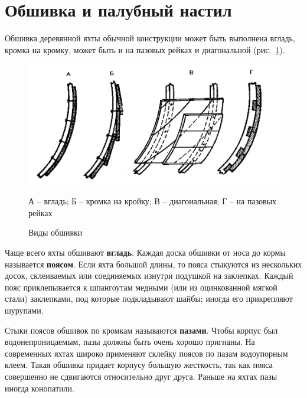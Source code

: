 \documentclass[a4paper, 12pt, twoside, final]{scrbook}
\begin{document}
%
%

\section{Обшивка и палубный настил}

Обшивка деревянной яхты обычной конструкции может быть выполнена вгладь,
кромка на кромку, может быть и на пазовых рейках и диагональной (рис.~\ref{fig:29}).

\begin{figure}[htbp]
\begin{centering}
\includegraphics{pics/Vidy_obshivki}
\par\end{centering}

\protect\caption{\label{fig:29}Виды обшивки}


\begin{centering}\small
А \--- вгладь; Б \--- кромка на кройку; В \--- диагональная; Г \--- на пазовых рейках
\par\end{centering}

\end{figure}


Чаще всего яхты обшивают \textbf{вгладь}. Каждая доска обшивки от
носа до кормы называется \textbf{поясом}. Если яхта большой длины,
то пояса стыкуются из нескольких досок, склеиваемых или соединяемых
изнутри подушкой на заклепках. Каждый пояс приклепывается к шпангоутам
медными (или из оцинкованной мягкой стали) заклепками, под которые
подкладывают шайбы; иногда его прикрепляют шурупами.

Стыки поясов обшивок по кромкам называются \textbf{пазами}. Чтобы
корпус был водонепроницаемым, пазы должны быть очень хорошо пригнаны.
На современных яхтах широко применяют склейку поясов по пазам водоупорным
клеем. Такая обшивка придает корпусу большую жесткость, так как пояса
совершенно не сдвигаются относительно друг друга. Раньше на яхтах
пазы иногда конопатили.
\end{document}
